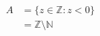 \documentclass{article}
\begin{document}
\begin{align*}
  A &= \{z\in\mathbb{Z}:z<0\}\\
  &= \mathbb{Z}\setminus\mathbb{N}
\end{align*}
\end{document}
